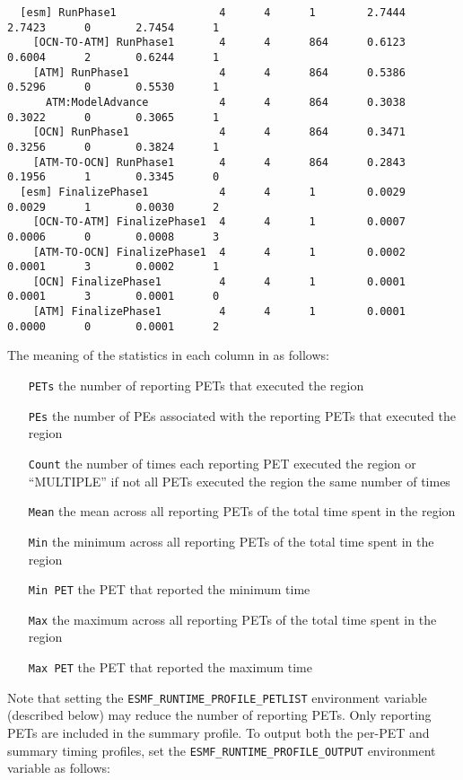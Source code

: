 \begin{verbatim}
  [esm] RunPhase1                4      4      1        2.7444      2.7423      0       2.7454      1
    [OCN-TO-ATM] RunPhase1       4      4      864      0.6123      0.6004      2       0.6244      1
    [ATM] RunPhase1              4      4      864      0.5386      0.5296      0       0.5530      1
      ATM:ModelAdvance           4      4      864      0.3038      0.3022      0       0.3065      1
    [OCN] RunPhase1              4      4      864      0.3471      0.3256      0       0.3824      1
    [ATM-TO-OCN] RunPhase1       4      4      864      0.2843      0.1956      1       0.3345      0
  [esm] FinalizePhase1           4      4      1        0.0029      0.0029      1       0.0030      2
    [OCN-TO-ATM] FinalizePhase1  4      4      1        0.0007      0.0006      0       0.0008      3
    [ATM-TO-OCN] FinalizePhase1  4      4      1        0.0002      0.0001      3       0.0002      1
    [OCN] FinalizePhase1         4      4      1        0.0001      0.0001      3       0.0001      0
    [ATM] FinalizePhase1         4      4      1        0.0001      0.0000      0       0.0001      2
\end{verbatim}

The meaning of the statistics in each column in as follows:
\begin{itemize}
\item [{\tt PETs}] the number of reporting PETs that executed the region
\item [{\tt PEs}] the number of PEs associated with the reporting PETs that executed the region
\item [{\tt Count}] the number of times each reporting PET executed the region
      or ``MULTIPLE'' if not all PETs executed the region the same number of times
\item [{\tt Mean}] the mean across all reporting PETs of the total time spent in the region
\item [{\tt Min}] the minimum across all reporting PETs of the total time spent in the region
\item [{\tt Min PET}] the PET that reported the minimum time
\item [{\tt Max}] the maximum across all reporting PETs of the total time spent in the region
\item [{\tt Max PET}] the PET that reported the maximum time
\end{itemize}

Note that setting the {\tt ESMF\_RUNTIME\_PROFILE\_PETLIST} environment variable
(described below) may reduce the number of reporting PETs. Only reporting PETs are
included in the summary profile. To output both the per-PET and summary timing profiles,
set the {\tt ESMF\_RUNTIME\_PROFILE\_OUTPUT} environment variable as follows:


